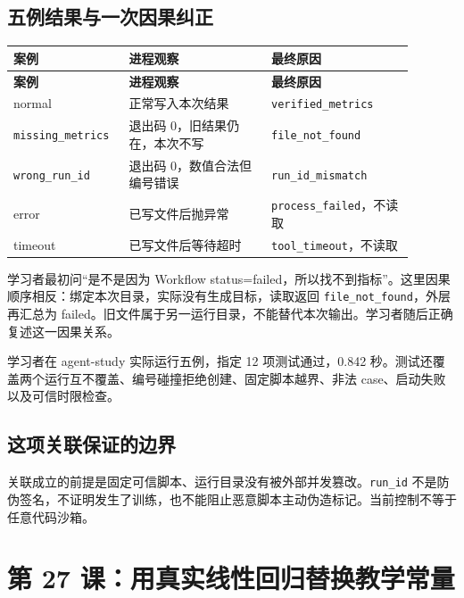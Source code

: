 \subsection{五例结果与一次因果纠正}

{\small\setlength{\tabcolsep}{4pt}
\renewcommand{\arraystretch}{1.25}
\begin{longtable}{>{\raggedright\arraybackslash}p{0.23\linewidth}>{\raggedright\arraybackslash}p{0.33\linewidth}>{\raggedright\arraybackslash}p{0.33\linewidth}}
\toprule
\textbf{案例} & \textbf{进程观察} & \textbf{最终原因} \\
\midrule\endfirsthead
\toprule
\textbf{案例} & \textbf{进程观察} & \textbf{最终原因} \\
\midrule\endhead
\bottomrule\endfoot
normal & 正常写入本次结果 & \nolinkurl{verified_metrics} \\
\nolinkurl{missing_metrics} & 退出码 0，旧结果仍在，本次不写 & \nolinkurl{file_not_found} \\
\nolinkurl{wrong_run_id} & 退出码 0，数值合法但编号错误 & \nolinkurl{run_id_mismatch} \\
error & 已写文件后抛异常 & \nolinkurl{process_failed}，不读取 \\
timeout & 已写文件后等待超时 & \nolinkurl{tool_timeout}，不读取 \\
\end{longtable}}

学习者最初问“是不是因为 Workflow status=failed，所以找不到指标”。这里因果顺序相反：绑定本次目录，实际没有生成目标，读取返回 \nolinkurl{file_not_found}，外层再汇总为 failed。旧文件属于另一运行目录，不能替代本次输出。学习者随后正确复述这一因果关系。

学习者在 agent-study 实际运行五例，指定 12 项测试通过，0.842 秒。测试还覆盖两个运行互不覆盖、编号碰撞拒绝创建、固定脚本越界、非法 case、启动失败以及可信时限检查。

\subsection{这项关联保证的边界}

关联成立的前提是固定可信脚本、运行目录没有被外部并发篡改。\nolinkurl{run_id} 不是防伪签名，不证明发生了训练，也不能阻止恶意脚本主动伪造标记。当前控制不等于任意代码沙箱。

\section{第 27 课：用真实线性回归替换教学常量}

